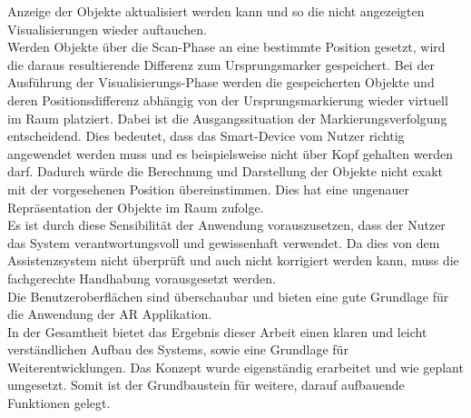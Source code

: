 Anzeige der Objekte aktualisiert werden kann und so die nicht angezeigten Visualisierungen wieder auftauchen.
\\ 
\linebreak
Werden Objekte über die Scan-Phase an eine bestimmte Position gesetzt, wird die daraus resultierende Differenz zum Ursprungsmarker gespeichert. Bei der 
Ausführung der Visualisierungs-Phase werden die gespeicherten Objekte und deren Positionsdifferenz abhängig von der Ursprungsmarkierung wieder virtuell im Raum platziert. 
Dabei ist die Ausgangssituation der Markierungsverfolgung entscheidend. Dies bedeutet, dass das Smart-Device vom Nutzer richtig angewendet werden muss und es beispielsweise 
nicht über Kopf gehalten werden darf. Dadurch würde die Berechnung und Darstellung der Objekte nicht exakt mit der vorgesehenen Position übereinstimmen. Dies hat eine 
ungenauer Repräsentation der Objekte im Raum zufolge. 
\\ 
Es ist durch diese Sensibilität der Anwendung vorauszusetzen, dass der Nutzer das System verantwortungsvoll und gewissenhaft verwendet. Da dies von dem Assistenzsystem nicht überprüft 
und auch nicht korrigiert werden kann, muss die fachgerechte Handhabung vorausgesetzt werden. 
\\ 
\linebreak
Die Benutzeroberflächen sind überschaubar und bieten eine gute Grundlage für die Anwendung der \acl{AR} Applikation. 
\\ 
\linebreak
In der Gesamtheit bietet das Ergebnis dieser Arbeit einen klaren und leicht verständlichen Aufbau des Systems, sowie eine Grundlage für Weiterentwicklungen. 
Das Konzept wurde eigenständig erarbeitet und wie geplant umgesetzt. Somit ist der Grundbaustein für weitere, darauf aufbauende Funktionen gelegt.

